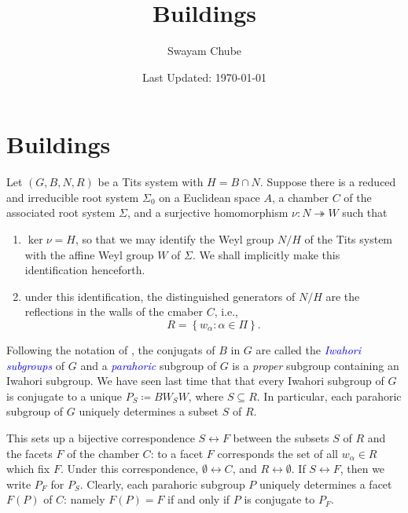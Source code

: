 \documentclass{article}
\title{Buildings}
\author{Swayam Chube}
\date{Last Updated: \today}
\theoremstyle{thmstyle}
\theoremstyle{defstyle}
\newcommand{\onto}{\twoheadrightarrow}
\newcommand{\define}[1]{\textcolor{blue}{\textit{#1}}}
\begin{document}
\maketitle

\setcounter{section}{3}
\section{Buildings}

Let $(G, B, N, R)$ be a Tits system with $H = B\cap N$. Suppose there is a reduced and irreducible root system $\Sigma_0$ on a Euclidean space $A$, a chamber $C$ of the associated root system $\Sigma$, and a surjective homomorphism $\nu: N\onto W$ such that 
\begin{enumerate}[label=(\roman*)]
    \item $\ker\nu = H$, so that we may identify the Weyl group $N/H$ of the Tits system with the affine Weyl group $W$ of $\Sigma$. We shall implicitly make this identification henceforth.
    \item under this identification, the distinguished generators of $N/H$ are the reflections in the walls of the cmaber $C$, i.e., 
    \begin{equation*}
        R = \left\{w_\alpha\colon\alpha\in\Pi\right\}.
    \end{equation*}
\end{enumerate}
Following the notation of \cite{macdonald-spherical-functions}, the conjugats of $B$ in $G$ are called the \define{Iwahori subgroups} of $G$ and a \define{parahoric} subgroup of $G$ is a \emph{proper} subgroup containing an Iwahori subgroup. We have seen last time that that every Iwahori subgroup of $G$ is conjugate to a unique $P_S \coloneq BW_SW$, where $S\subseteq R$. In particular, each parahoric subgroup of $G$ uniquely determines a subset $S$ of $R$.

This sets up a bijective correspondence $S\longleftrightarrow F$ between the subsets $S$ of $R$ and the facets $F$ of the chamber $C$: to a facet $F$ corresponds the set of all $w_\alpha\in R$ which fix $F$. Under this correspondence, $\emptyset\longleftrightarrow C$, and $R\longleftrightarrow\emptyset$. If $S\longleftrightarrow F$, then we write $P_F$ for $P_S$. Clearly, each parahoric subgroup $P$ uniquely determines a facet $F(P)$ of $C$: namely $F(P) = F$ if and only if $P$ is conjugate to $P_F$.
\end{document}

